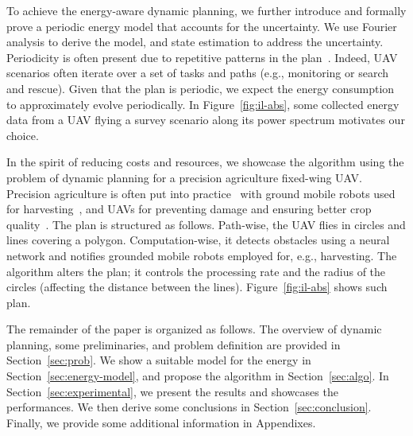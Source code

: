 \documentclass[letterpaper,10pt,conference]{ieeeconf}
\theoremstyle{definition}
\begin{document}
To achieve the energy-aware dynamic planning, we further introduce and formally prove a periodic energy model that accounts for the uncertainty. We use Fourier analysis to derive the model, and state estimation to address the uncertainty. Periodicity is often present due to repetitive patterns in the plan~\cite{seewald2020mechanical}. Indeed, UAV scenarios often iterate over a set of tasks and paths (e.g., monitoring or search and rescue). Given that the plan is periodic, we expect the energy consumption to approximately evolve periodically. In Figure~\ref{fig:il-abs}, some collected energy data from a UAV flying a survey scenario along its power spectrum motivates our choice.

In the spirit of reducing costs and resources, we showcase the algorithm using the problem of dynamic planning for a precision agriculture fixed-wing UAV. Precision agriculture is often put into practice~\cite{hajjaj2014review} with ground mobile robots used for harvesting~\cite{qingchun2012study,dong2011development, de2011design, aljanobi2010setup, li2008analysis, edan2000robotic}, and UAVs for preventing damage and ensuring better crop quality~\cite{puri2017agriculture, daponte2019review}. The plan is structured as follows. Path-wise, the UAV flies in circles and lines covering a polygon. Computation-wise, it detects obstacles using a neural network and notifies grounded mobile robots employed for, e.g., harvesting. The algorithm alters the plan; it controls the processing rate and the radius of the circles (affecting the distance between the lines). Figure~\ref{fig:il-abs} shows such plan. 

The remainder of the paper is organized as follows. The overview of dynamic planning, some preliminaries, and problem definition are provided in Section~\ref{sec:prob}. We show a suitable model for the energy in Section~\ref{sec:energy-model}, and propose the algorithm in Section~\ref{sec:algo}. In Section~\ref{sec:experimental}, we present the results and showcases the performances. We then derive some conclusions in Section~\ref{sec:conclusion}. Finally, we provide some additional information in Appendixes.


\end{document}
